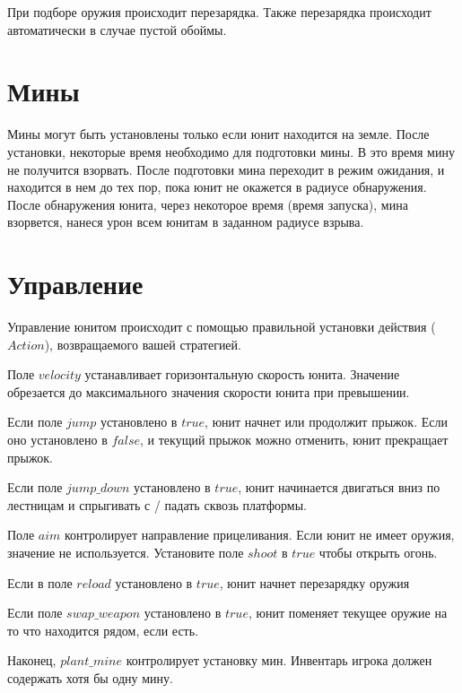 При подборе оружия происходит перезарядка.
Также перезарядка происходит автоматически в случае пустой обоймы.

\section{Мины}

Мины могут быть установлены только если юнит находится на земле.
После установки, некоторые время необходимо для подготовки мины. В это время мину не получится взорвать.
После подготовки мина переходит в режим ожидания, и находится в нем до тех пор,
пока юнит не окажется в радиусе обнаружения.
После обнаружения юнита, через некоторое время (время запуска), мина взорвется, нанеся урон всем юнитам в заданном радиусе взрыва.

\section{Управление}

Управление юнитом происходит с помощью правильной установки действия ($Action$), возвращаемого вашей стратегией.

Поле $velocity$ устанавливает горизонтальную скорость юнита. Значение обрезается до максимального значения скорости юнита при превышении.

Если поле $jump$ установлено в $true$, юнит начнет или продолжит прыжок.
Если оно установлено в $false$, и текущий прыжок можно отменить, юнит прекращает прыжок.

Если поле $jump\_down$ установлено в $true$, юнит начинается двигаться вниз по лестницам и спрыгивать с / падать сквозь платформы.

Поле $aim$ контролирует направление прицеливания. Если юнит не имеет оружия, значение не используется.
Установите поле $shoot$ в $true$ чтобы открыть огонь.

Если в поле $reload$ установлено в $true$, юнит начнет перезарядку оружия

Если поле $swap\_weapon$ установлено в $true$, юнит поменяет текущее оружие на то что находится рядом, если есть.

Наконец, $plant\_mine$ контролирует установку мин. Инвентарь игрока должен содержать хотя бы одну мину.
